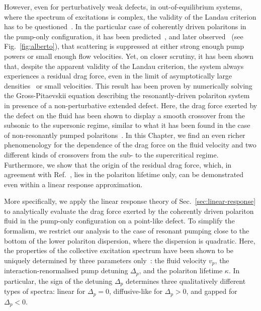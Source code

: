 However, even for perturbatively weak defects, in out-of-equilibrium
systems, where the spectrum of excitations is complex, the validity of
the Landau criterion has to be
questioned~\cite{Szyma_ska_2006,Wouters_2010,Cancellieri_2010}. In the
particular case of coherently driven polaritons in the pump-only
configuration, it has been predicted~\cite{Carusotto_2004,Ciuti_2005},
and later observed~\cite{Amo_2009} (see Fig.~\ref{fig:alberto}), that
scattering is suppressed at either strong enough pump powers or small
enough flow velocities. Yet, on closer scrutiny, it has been shown
that, despite the apparent validity of the Landau criterion, the
system always experiences a residual drag force, even in the limit of
asymptotically large densities~\cite{Cancellieri_2010} or small
velocities. This result has been proven by numerically solving the
Gross-Pitaevskii equation describing the resonantly-driven polariton
system in presence of a non-perturbative extended defect. Here, the
drag force exerted by the defect on the fluid has been shown to
display a smooth crossover from the subsonic to the supersonic regime,
similar to what it has been found in the case of non-resonantly pumped
polaritons~\cite{Wouters_2010}. In this Chapter, we find an even
richer phenomenology for the dependence of the drag force on the fluid
velocity and two different kinds of crossovers from the sub- to the
supercritical regime. Furthermore, we show that the origin of the
residual drag force, which, in agreement with
Ref.~\cite{Cancellieri_2010}, lies in the polariton lifetime only, can
be demonstrated even within a linear response approximation.

More specifically, we apply the linear response theory of
Sec.~\ref{sec:linear-response} to analytically evaluate the drag force
exerted by the coherently driven polariton fluid in the pump-only
configuration on a point-like defect. To simplify the formalism, we
restrict our analysis to the case of resonant pumping close to the
bottom of the lower polariton dispersion, where the dispersion is
quadratic. Here, the properties of the collective excitation spectrum
have been shown to be uniquely determined by three parameters
only~\cite{Ciuti_2005}: the fluid velocity $v_p$, the
interaction-renormalised pump detuning $\Delta_p$, and the polariton
lifetime $\kappa$. In particular, the sign of the detuning $\Delta_p$
determines three qualitatively different types of spectra: linear for
$\Delta_p= 0$, diffusive-like for $\Delta_p> 0$, and gapped for
$\Delta_p< 0$.

